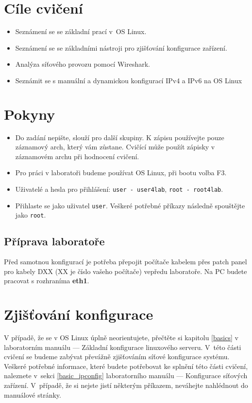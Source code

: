 \section*{Cíle cvičení}
\begin{itemize}
	\item Seznámení se se základní prací v~OS Linux.
	\item Seznámení se se základními nástroji pro zjišťování konfigurace zařízení.
	\item Analýza síťového provozu pomocí Wireshark.
	\item Seznámit se s manuální a dynamickou konfigurací IPv4 a IPv6 na OS Linux
\end{itemize}

\section*{Pokyny}
\begin{itemize}
\item Do zadání nepište, slouží pro další skupiny. K zápisu používejte pouze
  záznamový arch, který vám zůstane. Cvičící může použít zápisky v záznamovém
    archu při hodnocení cvičení.
\item Pro práci v laboratoři budeme používat OS Linux, při bootu volba F3.
\item Uživatelé a hesla pro přihlášení: \texttt{user - user4lab}, \texttt{root - root4lab}.
\item Přihlaste se jako uživatel \texttt{user}. Veškeré potřebné příkazy následně spouštějte jako \texttt{root}.
\end{itemize}

\subsection*{Příprava laboratoře}
Před samotnou konfigurací je potřeba přepojit počítače kabelem přes patch panel
pro kabely DXX (XX je číslo vašeho počítače) vepředu laboratoře. Na PC budete
pracovat s rozhraníma {\bf eth1}.

\section{Zjišťování konfigurace}
V případě, že se v OS Linux úplně neorientujete, přečtěte si kapitolu \ref{basics} v
laboratorním manuálu --- Základní konfigurace linuxového serveru. V~této části cvičení se
budeme zabývat převážně zjišťováním síťové konfigurace systému. Veškeré potřebné
informace, které budete potřebovat ke splnění této části cvičení, naleznete
v~sekci \ref{basic_ipconfig} laboratorního manuálu --- Konfigurace síťových zařízení. V~případě, že si nejste jistí některým příkazem, neváhejte nahlédnout do manuálové stránky.

